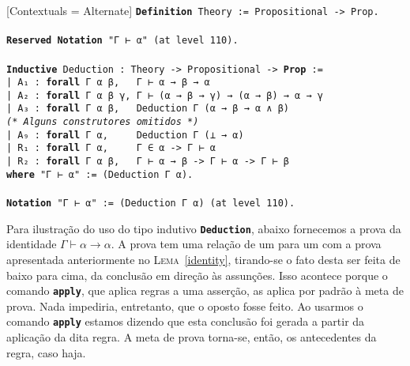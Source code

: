 \vspace{0.5\baselineskip}
\begin{tcolorbox}[enhanced jigsaw, breakable, sharp corners, colframe=black, colback=white, boxrule=0.5pt, left=1.5mm, right=1.5mm, top=1.5mm, bottom=1.5mm]
\setmonofont{Fira Code}[Contextuals = Alternate]
\noindent
\texttt
{\noindent\footnotesize\textbf{Definition} Theory := Propositional -> Prop.\\
\\
\textbf{Reserved} \textbf{Notation} "Γ ⊢ α"\ (at level 110).\\
\\
\textbf{Inductive} Deduction : Theory -> Propositional -> \textbf{Prop} :=\\
| A₁ : \textbf{forall} Γ α β,\ \ \ Γ ⊢ α → β → α\\
| A₂ : \textbf{forall} Γ α β γ, Γ ⊢ (α → β → γ) → (α → β) → α → γ\\
| A₃ : \textbf{forall} Γ α β,\ \ \ Deduction Γ (α → β → α ∧ β)\\
\textit{(* Alguns construtores omitidos *)}\\
| A₉ : \textbf{forall} Γ α,\ \ \ \ \ Deduction Γ (⊥ → α)\\
| R₁ : \textbf{forall} Γ α,\ \ \ \ \ Γ ∈ α -> Γ ⊢ α\\
| R₂ : \textbf{forall} Γ α β,\ \ \ Γ ⊢ α → β -> Γ ⊢ α -> Γ ⊢ β\\
\textbf{where} "Γ ⊢ α" := (Deduction Γ α).\\
\\
\textbf{Notation} "Γ ⊢ α" := (Deduction Γ α) (at level 110).
}
\end{tcolorbox}

\vspace{0.5\baselineskip}
Para ilustração do uso do tipo indutivo \texttt{\textbf{Deduction}}, abaixo fornecemos a prova da identidade $\Gamma\vdash\alpha\to\alpha$.
A prova tem uma relação de um para um com a prova apresentada anteriormente no \textsc{Lema}~\ref{identity}, tirando-se o fato desta ser feita de baixo para cima, da conclusão em direção às assunções.
Isso acontece porque o comando \texttt{\textbf{apply}}, que aplica regras a uma asserção, as aplica por padrão à meta de prova.
Nada impediria, entretanto, que o oposto fosse feito.
Ao usarmos o comando \texttt{\textbf{apply}} estamos dizendo que esta conclusão foi gerada a partir da aplicação da dita regra.
A meta de prova torna-se, então, os antecedentes da regra, caso haja.

